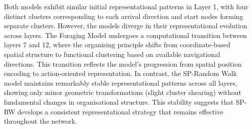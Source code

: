 Both models exhibit similar initial representational patterns in Layer 1, with four distinct clusters corresponding to each arrival direction and start nodes forming separate clusters. However, the models diverge in their representational evolution across layers. The Foraging Model undergoes a computational transition between layers 7 and 12, where the organising principle shifts from coordinate-based spatial structure to functional clustering based on available navigational directions. This transition reflects the model's progression from spatial position encoding to action-oriented representation. In contrast, the SP-Random Walk model maintains remarkably stable representational patterns across all layers, showing only minor geometric transformations (slight cluster shearing) without fundamental changes in organisational structure. This stability suggests that SP-RW develops a consistent representational strategy that remains effective throughout the network.






